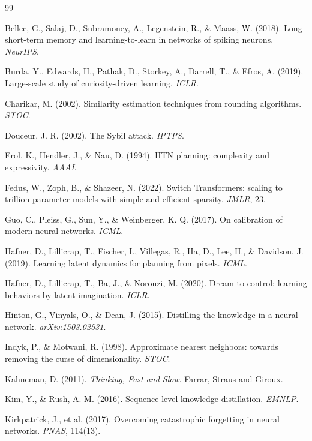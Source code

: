\documentclass[10pt,twocolumn]{article}
\begin{document}
\begin{thebibliography}{99}\small

 Bellec, G., Salaj, D., Subramoney, A., Legenstein, R., \&
Maass, W. (2018). Long short-term memory and learning-to-learn in networks of
spiking neurons. \emph{NeurIPS}.

 Burda, Y., Edwards, H., Pathak, D., Storkey, A., Darrell,
T., \& Efros, A. (2019). Large-scale study of curiosity-driven learning.
\emph{ICLR}.

 Charikar, M. (2002). Similarity estimation techniques
from rounding algorithms. \emph{STOC}.

 Douceur, J. R. (2002). The Sybil attack. \emph{IPTPS}.

 Erol, K., Hendler, J., \& Nau, D. (1994). HTN planning:
complexity and expressivity. \emph{AAAI}.

 Fedus, W., Zoph, B., \& Shazeer, N. (2022). Switch
Transformers: scaling to trillion parameter models with simple and efficient
sparsity. \emph{JMLR}, 23.

 Guo, C., Pleiss, G., Sun, Y., \& Weinberger, K. Q. (2017). On
calibration of modern neural networks. \emph{ICML}.

 Hafner, D., Lillicrap, T., Fischer, I., Villegas, R., Ha,
D., Lee, H., \& Davidson, J. (2019). Learning latent dynamics for planning from
pixels. \emph{ICML}.

 Hafner, D., Lillicrap, T., Ba, J., \& Norouzi, M. (2020).
Dream to control: learning behaviors by latent imagination. \emph{ICLR}.

 Hinton, G., Vinyals, O., \& Dean, J. (2015). Distilling
the knowledge in a neural network. \emph{arXiv:1503.02531}.

 Indyk, P., \& Motwani, R. (1998). Approximate nearest
neighbors: towards removing the curse of dimensionality. \emph{STOC}.

 Kahneman, D. (2011). \emph{Thinking, Fast and Slow}.
Farrar, Straus and Giroux.

 Kim, Y., \& Rush, A. M. (2016). Sequence-level knowledge
distillation. \emph{EMNLP}.

 Kirkpatrick, J., et al. (2017). Overcoming
catastrophic forgetting in neural networks. \emph{PNAS}, 114(13).


\end{thebibliography}
\end{document}
